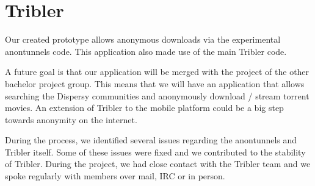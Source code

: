 \section{Tribler}
	Our created prototype allows anonymous downloads via the experimental anontunnels code. This application also made use of the main Tribler code.
	
	A future goal is that our application will be merged with the project of the other bachelor project group. This means that we will have an application that allows searching the Dispersy communities and anonymously download / stream torrent movies. An extension of Tribler to the mobile platform could be a big step towards anonymity on the internet.
	
	During the process, we identified several issues regarding the anontunnels and Tribler itself. Some of these issues were fixed and we contributed to the stability of Tribler. During the project, we had close contact with the Tribler team and we spoke regularly with members over mail, IRC or in person.